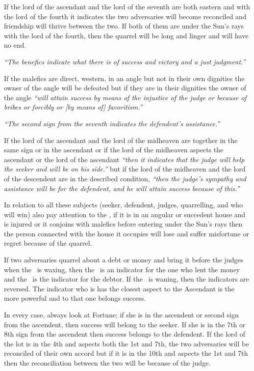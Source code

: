 If the lord of the ascendant and the lord of the seventh are both eastern and with the lord of the fourth it indicates the two adversaries will become reconciled and friendship will thrive between the two. If both of them are under the Sun's rays with the lord of the fourth, then the quarrel will be long and linger and will have no end.

\textsl{``The benefics indicate what there is of success and victory and a just judgment.''}

If the malefics are direct, western, in an angle but not in their own dignities the owner of the angle will be defeated but if they are in their dignities the owner of the angle \textsl{``will attain success by means of the injustice of the judge or because of bribes or forcibly or [by means of] favoritism.''}

\textsl{``The second sign from the seventh indicates the defendent's assistance.''}

If the lord of the ascendant and the lord of the midheaven are together in the same sign or in the ascendant or if the lord of the midheaven aspects the ascendant or the lord of the ascendant \textsl{``then it indicates that the judge will help the seeker and will be on his side.''} but if the lord of the midheaven and the lord of the descendent are in the described condition, \textsl{``then the judge's sympathy and assistance will be for the defendent, and he will attain success because of this.''}

In relation to all these subjects (seeker, defendent, judges, quarrelling, and who will win) also pay attention to the \Moon, if it is in an angular or succedent house and is  injured or it conjoins with malefics before entering under the Sun's rays then the person connected with the house it occupies will lose and suffer misfortune or regret because of the quarrel.

If two adversaries quarrel about a debt or money and bring it before the judges when the \Moon\, is waxing, then the \Moon\, is an indicator for the one who lent the money and the \Sun\, is the indicator for the debtor. If the \Moon\, is waning, then the indicators are reversed.  The indicator who is has the closest aspect to the Ascendant is the more powerful and to that one belongs success.

In every case, always look at Fortune; if she is in the ascendent or second sign from the ascendent, then success will belong to the seeker. If she is in the 7th or 8th sign from the ascendent then success belongs to the defendent. If the lord of the lot is in the 4th and aspects both the 1st and 7th, the two adversaries will be reconciled of their own accord but if it is in the 10th and aspects the 1st and 7th then the reconciliation between the two will be because of the judge.

